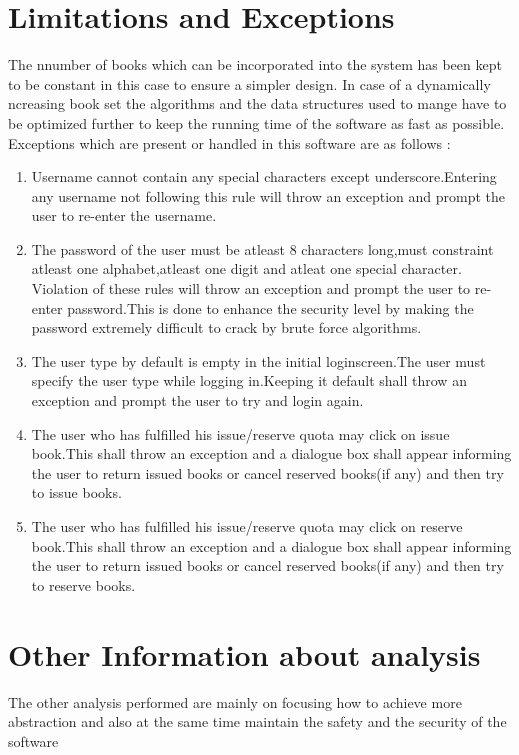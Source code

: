 \documentclass[a4paper]{article}
\begin{document}
\section{Limitations and Exceptions}
The nnumber of books which can be incorporated into the system has been kept to be constant in this case to ensure a simpler design.
In case of a dynamically ncreasing book set the algorithms and the data structures used to mange have to be optimized further to keep the running time of the software as fast as possible.
\\
Exceptions which are present or handled in this software are as follows :
\begin{enumerate}
\item Username cannot contain any special characters except underscore.Entering any username not following this rule will throw an exception and prompt the user to re-enter the username.
\item The password of the user must be atleast 8 characters long,must constraint atleast one alphabet,atleast one digit and atleat one special character. Violation of these rules will throw an exception and prompt the user to re-enter password.This is done to enhance the security level by making the password extremely difficult to crack by brute force algorithms.
\item The user type by default is empty in the initial  loginscreen.The user must specify the user type while logging in.Keeping it default shall throw an exception and prompt the user to try and login again.
\item The user who has fulfilled his issue/reserve quota may click on issue book.This shall throw an exception and a dialogue box shall appear informing the user to return issued books or cancel reserved books(if any) and then try to issue books.
\item The user who has fulfilled his issue/reserve quota may click on reserve book.This shall throw an exception and a dialogue box shall appear informing the user to return issued books or cancel reserved books(if any) and then try to reserve books.
   
\end{enumerate}
\section{Other Information about analysis}
The other analysis performed are mainly on focusing how to achieve more abstraction and also at the same time maintain the safety and the security of the software
\end{document}
